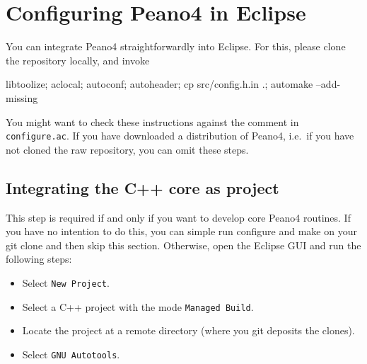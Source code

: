 \chapter{Configuring Peano4 in Eclipse}


You can integrate Peano4 straightforwardly into Eclipse. For this, please clone
the repository locally, and invoke

\begin{code}
libtoolize; aclocal; 
autoconf; autoheader; 
cp src/config.h.in .; 
automake --add-missing
\end{code}

\noindent
You might want to check these instructions against the comment in
\texttt{configure.ac}. If you have downloaded a distribution of Peano4,
i.e.~if you have not cloned the raw repository, you can omit these steps.


\section{Integrating the C++ core as project}

This step is required if and only if you want to develop core Peano4 routines.
If you have no intention to do this, you can simple run configure and make on
your git clone and then skip this section. 
Otherwise, open the Eclipse GUI and run the following steps:

\begin{itemize}
  \item Select \texttt{New Project}.
  \item Select a C++ project with the mode \texttt{Managed Build}.
  \item Locate the project at a remote directory (where you git deposits the
  clones).
  \item Select \texttt{GNU Autotools}.
\end{itemize}



